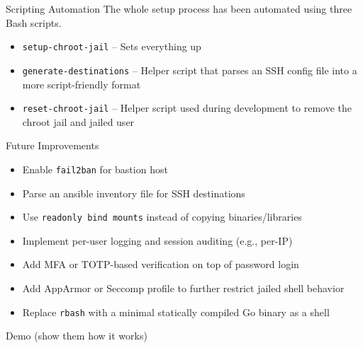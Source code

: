 \documentclass[14pt,compress,dvipsnames,aspectratio=169]{beamer} %
\begin{document}
\begin{frame}{Scripting Automation}
    The whole setup process has been automated using three Bash scripts.  
    \vspace{1.0cm}
    \begin{itemize}
        \item{\texttt{setup-chroot-jail} -- Sets everything up} 
        \vspace{1.0cm}
        \item{\texttt{generate-destinations} -- Helper script that parses an SSH
            config file into a more script-friendly format}
        \vspace{1.0cm}
        \item{\texttt{reset-chroot-jail} -- Helper script used during development to
            remove the chroot jail and jailed user}
    \end{itemize}
\end{frame}

\begin{frame}{Future Improvements}
    \begin{itemize}
        \item{Enable \texttt{fail2ban} for bastion host} 
        \item{Parse an ansible inventory file for SSH destinations} 
        \item{Use \texttt{readonly bind mounts} instead of copying binaries/libraries}
        \item{Implement per-user logging and session auditing (e.g., per-IP)}
        \item{Add MFA or TOTP-based verification on top of password login}
        \item{Add AppArmor or Seccomp profile to further restrict jailed shell behavior}
        \item{Replace \texttt{rbash} with a minimal statically compiled Go binary as a shell}
    \end{itemize}
\end{frame}

\begin{frame}{Demo}
    (show them how it works)
\end{frame}
\end{document}
